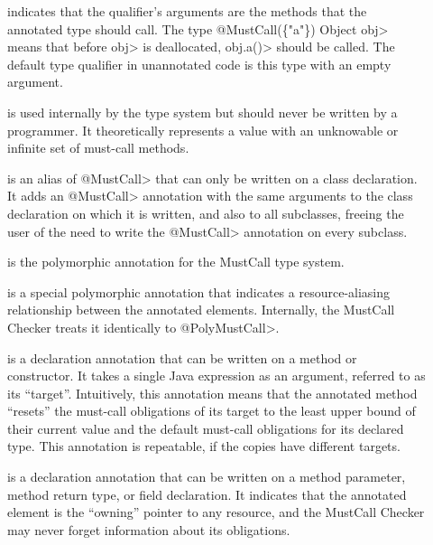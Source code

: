 \begin{description}

\item[]
  indicates that the qualifier's arguments are the methods that the annotated type
  should call. The type \<@MustCall(\{"a"\}) Object obj> means
  that before \<obj> is deallocated, \<obj.a()> should be called.
  The default type qualifier in unannotated code is this type with an empty argument.

\item[]
  is used internally by the type system but should never be written by a
  programmer.  It theoretically represents a value with an unknowable or infinite set
  of must-call methods.

\item[]
  is an alias of \<@MustCall> that can only be written on a class declaration. It adds an \<@MustCall>
  annotation with the same arguments to
  the class declaration on which it is written, and also to all subclasses, freeing the user of the need
  to write the \<@MustCall> annotation on every subclass.

\item[]
  is the polymorphic annotation for the MustCall type system.

\item[]
  is a special polymorphic annotation that indicates a resource-aliasing relationship between
  the annotated elements. Internally, the MustCall Checker treats it identically to \<@PolyMustCall>.

\item[]
  is a declaration annotation that can be written on a method or constructor. It takes a single Java expression as an
  argument, referred to as its ``target''. Intuitively, this annotation means that the annotated method
  ``resets'' the must-call obligations of its target to the least upper bound of their current value and the default
  must-call obligations for its declared type. This annotation is repeatable, if the copies have different targets.

\item[]
  is a declaration annotation that can be written on a method parameter, method return type, or
  field declaration. It indicates that the annotated element is the ``owning'' pointer to any resource,
  and the MustCall Checker may never forget information about its obligations.


\end{description}
